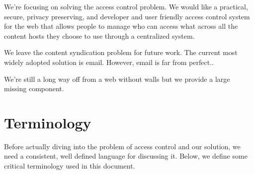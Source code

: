 \documentclass[pdftex,12pt,a4papaer,twoside,notitlepage]{report}
\begin{document}
We're focusing on solving the access control problem. We would like a practical,
secure, privacy preserving, and developer and user friendly access control
system for the web that allows people to manage who can access what across all
the content hosts they choose to use through a centralized system.

We leave the content syndication problem for future work. The current most
widely adopted solution is email. However, email is far from
perfect..

We're still a long way off from a web without walls but we provide a large
missing component.

\section{Terminology}

Before actually diving into the problem of access control and our solution, we
need a consistent, well defined language for discussing it. Below, we define
some critical terminology used in this document.
\end{document}
